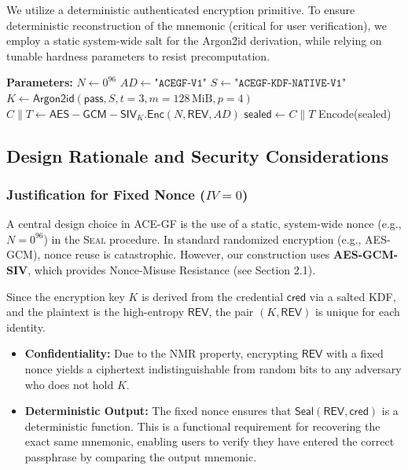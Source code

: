 \documentclass[12pt,a4paper]{article}
\begin{document}
  We utilize a deterministic authenticated encryption primitive. To ensure deterministic reconstruction of the mnemonic (critical for user verification), we employ a static system-wide salt for the Argon2id derivation, while relying on tunable hardness parameters to resist precomputation.

  \begin{algorithm}[H]
   \caption{Seal($\mathsf{REV}$, $\mathsf{pass}$)}
   \begin{algorithmic}[1]
  \State \textbf{Parameters:}
  \State \quad $N \gets 0^{96}$ 
  \State \quad $AD \gets \texttt{"ACEGF-V1"}$ 
  \State \quad $S \gets \texttt{"ACEGF-KDF-NATIVE-V1"}$ 
  \State $K \gets \mathsf{Argon2id}(\mathsf{pass}, S, t=3, m=128\,\text{MiB}, p=4)$
  \State $C \parallel T \gets \mathsf{AES-GCM-SIV}_K.\mathsf{Enc}(N, \mathsf{REV}, AD)$
  \State $\mathsf{sealed} \gets C \parallel T$ 
  \State \Return \textsf{Encode}(\textsf{sealed}) 
   \end{algorithmic}
  \end{algorithm}

  \subsection{Design Rationale and Security Considerations}

  \subsubsection*{Justification for Fixed Nonce ($IV=0$)}
  A central design choice in ACE-GF is the use of a static, system-wide nonce (e.g., $N=0^{96}$) in the \textsc{Seal} procedure. In standard randomized encryption (e.g., AES-GCM), nonce reuse is catastrophic. However, our construction uses \textbf{AES-GCM-SIV}, which provides Nonce-Misuse Resistance (see Section 2.1).

  Since the encryption key $K$ is derived from the credential $\mathsf{cred}$ via a salted KDF, and the plaintext is the high-entropy $\mathsf{REV}$, the pair $(K, \mathsf{REV})$ is unique for each identity.
  \begin{itemize}
   \item \textbf{Confidentiality:} Due to the NMR property, encrypting $\mathsf{REV}$ with a fixed nonce yields a ciphertext indistinguishable from random bits to any adversary who does not hold $K$.
   \item \textbf{Deterministic Output:} The fixed nonce ensures that $\mathsf{Seal}(\mathsf{REV}, \mathsf{cred})$ is a deterministic function. This is a functional requirement for recovering the exact same mnemonic, enabling users to verify they have entered the correct passphrase by comparing the output mnemonic.
  \end{itemize}
\end{document}
